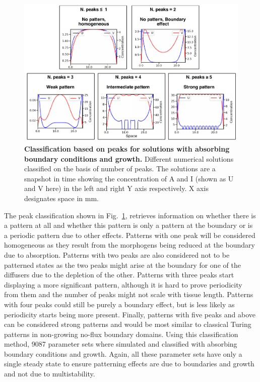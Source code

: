 \begin{figure}[H] %
    \centering
    \begin{adjustbox}{center}
        \includegraphics[width=1\textwidth]{chapters/Chapter 1/peaks_classification} %
    \end{adjustbox}
    \caption{\textbf{Classification based on peaks for solutions with absorbing boundary conditions and growth.} Different numerical solutions classified on the basis of number of peaks. The solutions are a snapshot in time showing the concentration of A and I (shown as U and V here) in the left and right Y axis respectively. X axis designates space in mm.}
    \label{fig:peaks_classification} %
\end{figure}

The peak classification shown in Fig.~\ref{fig:peaks_classification}, retrieves information on whether there is a pattern at all and whether this pattern is only a pattern at the boundary or is a periodic pattern due to other effects.
Patterns with one peak will be considered homogeneous as they result from the morphogens being reduced at the boundary due to absorption.
Patterns with two peaks are also considered not to be patterned states as the two peaks might arise at the boundary for one of the diffusers due to the depletion of the other.
Patterns with three peaks start displaying a more significant pattern, although it is hard to prove periodicity from them and the number of peaks might not scale with tissue length.
Patterns with four peaks could still be purely a boundary effect, but is less likely as periodicity starts being more present.
Finally, patterns with five peaks and above can be considered strong patterns and would be most similar to classical Turing patterns in non-growing no-flux boundary domains.
Using this classification method, 9087 parameter sets where simulated and classified with absorbing boundary conditions and growth.
Again, all these parameter sets have only a single steady state to ensure patterning effects are due to boundaries and growth and not due to multistability.


